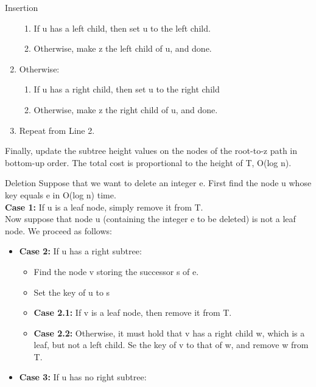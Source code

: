\documentclass{lecture}
\begin{document}
\begin{landscape}
\begin{multicols}{2}
\begin{note}{Insertion}
\begin{enumerate}[nolistsep]
                \begin{enumerate}[nolistsep]
                    \item If u has a left child, then set u to the left child.
                    \item Otherwise, make z the left child of u, and done.
                \end{enumerate}
            \item Otherwise:
                \begin{enumerate}[nolistsep]
                    \item If u has a right child, then set u to the right child
                    \item Otherwise, make z the right child of u, and done.
                \end{enumerate}
            \item Repeat from Line 2.
        \end{enumerate}
        Finally, update the subtree height values on the nodes of the root-to-z path in bottom-up order. The total cost is proportional to the height of T, O(log n).
    \end{note}
    \vfill
    \begin{note}{Deletion}
        Suppose that we want to delete an integer e. First find the node u whose key equals e in O(log n) time.\\
        \textbf{Case 1:} If u is a leaf node, simply remove it from T.\\
        Now suppose that node u (containing the integer e to be deleted) is not a leaf node. We proceed as follows:
        \begin{itemize}[nolistsep]
            \item \textbf{Case 2:} If u has a right subtree:
                \begin{itemize}[nolistsep]
                    \item Find the node v storing the successor s of e.
                    \item Set the key of u to s
                    \item \textbf{Case 2.1:} If v is a leaf node, then remove it from T.
                    \item \textbf{Case 2.2:} Otherwise, it must hold that v has a right child w, which is a leaf, but not a left child. Se the key of v to that of w, and remove w from T.
                \end{itemize}
            \item \textbf{Case 3:} If u has no right subtree:

\end{itemize}
\end{note}
\end{multicols}
\end{landscape}
\end{document}
